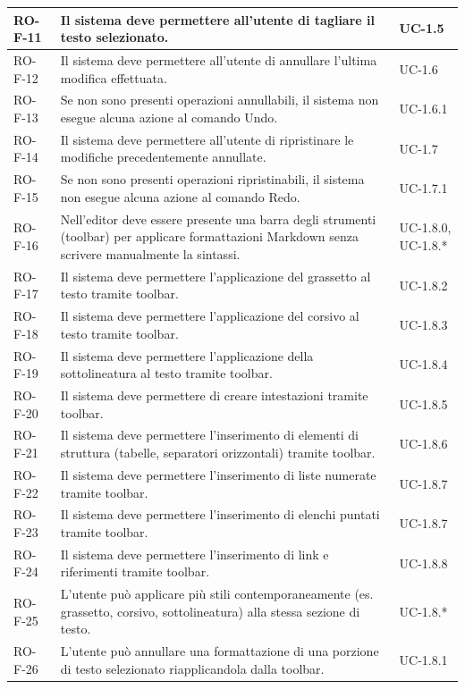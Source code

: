 \documentclass[11pt,a4paper]{article}
\begin{document}
\begin{longtable}{|p{}|>{\raggedright\arraybackslash}p{}|p{}|}
\hline
RO-F-11 & Il sistema deve permettere all'utente di tagliare il testo selezionato. & UC-1.5 \\
\hline
RO-F-12 & Il sistema deve permettere all'utente di annullare l'ultima modifica effettuata. & UC-1.6 \\
\hline
RO-F-13 & Se non sono presenti operazioni annullabili, il sistema non esegue alcuna azione al comando Undo. & UC-1.6.1 \\
\hline
RO-F-14 & Il sistema deve permettere all'utente di ripristinare le modifiche precedentemente annullate. & UC-1.7 \\
\hline
RO-F-15 & Se non sono presenti operazioni ripristinabili, il sistema non esegue alcuna azione al comando Redo. & UC-1.7.1 \\
\hline
RO-F-16 & Nell'editor deve essere presente una barra degli strumenti (toolbar) per applicare formattazioni Markdown senza scrivere manualmente la sintassi. & UC-1.8.0, UC-1.8.* \\
\hline
RO-F-17 & Il sistema deve permettere l'applicazione del grassetto al testo tramite toolbar. & UC-1.8.2 \\
\hline
RO-F-18 & Il sistema deve permettere l'applicazione del corsivo al testo tramite toolbar. & UC-1.8.3 \\
\hline
RO-F-19 & Il sistema deve permettere l'applicazione della sottolineatura al testo tramite toolbar. & UC-1.8.4 \\
\hline
RO-F-20 & Il sistema deve permettere di creare intestazioni tramite toolbar. & UC-1.8.5 \\
\hline
RO-F-21 & Il sistema deve permettere l'inserimento di elementi di struttura (tabelle, separatori orizzontali) tramite toolbar. & UC-1.8.6 \\
\hline
RO-F-22 & Il sistema deve permettere l'inserimento di liste numerate tramite toolbar. & UC-1.8.7 \\
\hline
RO-F-23 & Il sistema deve permettere l'inserimento di elenchi puntati tramite toolbar. & UC-1.8.7 \\
\hline
RO-F-24 & Il sistema deve permettere l'inserimento di link e riferimenti tramite toolbar. & UC-1.8.8 \\
\hline
RO-F-25 & L'utente può applicare più stili contemporaneamente (es. grassetto, corsivo, sottolineatura) alla stessa sezione di testo. & UC-1.8.* \\
\hline
RO-F-26 & L'utente può annullare una formattazione di una porzione di testo selezionato riapplicandola dalla toolbar. & UC-1.8.1 \\

\end{longtable}
\end{document}

